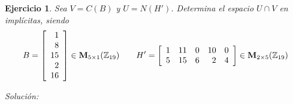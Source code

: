 \documentclass{amsart}
\newtheorem{ejer}{Ejercicio}
\begin{document}
\begin{ejer} Sea $V = C(B)$ y $U = N(H')$. Determina el espacio $U \cap V$ en impl\'icitas, siendo 
\[B = \left[\begin{array}{r}
1 \\
8 \\
15 \\
2 \\
16
\end{array}\right] \in {\bf M}_{5 \times 1}({\mathbb Z}_{19}) \qquad
H' = \left[\begin{array}{rrrrr}
1 & 11 & 0 & 10 & 0 \\
5 & 15 & 6 & 2 & 4
\end{array}\right] \in {\bf M}_{2 \times 5}({\mathbb Z}_{19}) \]
\end{ejer}

{\it Soluci\'on:}



\end{document}
